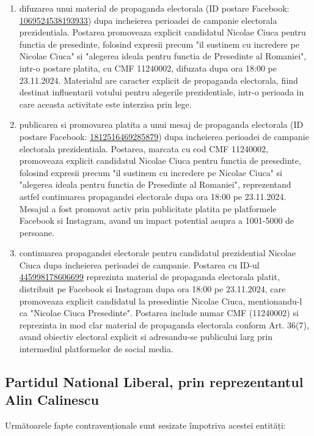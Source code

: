 \documentclass[a4paper,12pt]{article}
\begin{document}
\begin{enumerate}[leftmargin=*, label=\arabic*.)]
    \item difuzarea unui material de propaganda electorala (ID postare Facebook: \href{https://www.facebook.com/ads/library/?id=1069524538193933}{1069524538193933}) dupa incheierea perioadei de campanie electorala prezidentiala. Postarea promoveaza explicit candidatul Nicolae Ciuca pentru functia de presedinte, folosind expresii precum "il sustinem cu incredere pe Nicolae Ciuca" si "alegerea ideala pentru functia de Presedinte al Romaniei", intr-o postare platita, cu CMF 11240002, difuzata dupa ora 18:00 pe 23.11.2024. Materialul are caracter explicit de propaganda electorala, fiind destinat influentarii votului pentru alegerile prezidentiale, intr-o perioada in care aceasta activitate este interzisa prin lege.
    \item publicarea si promovarea platita a unui mesaj de propaganda electorala (ID postare Facebook: \href{https://www.facebook.com/ads/library/?id=1812516469285879}{1812516469285879}) dupa incheierea perioadei de campanie electorala prezidentiala. Postarea, marcata cu cod CMF 11240002, promoveaza explicit candidatul Nicolae Ciuca pentru functia de presedinte, folosind expresii precum "il sustinem cu incredere pe Nicolae Ciuca" si "alegerea ideala pentru functia de Presedinte al Romaniei", reprezentand astfel continuarea propagandei electorale dupa ora 18:00 pe 23.11.2024. Mesajul a fost promovat activ prin publicitate platita pe platformele Facebook si Instagram, avand un impact potential asupra a 1001-5000 de persoane.
    \item continuarea propagandei electorale pentru candidatul prezidential Nicolae Ciuca dupa incheierea perioadei de campanie. Postarea cu ID-ul \href{https://www.facebook.com/ads/library/?id=445998178606699}{445998178606699} reprezinta material de propaganda electorala platit, distribuit pe Facebook si Instagram dupa ora 18:00 pe 23.11.2024, care promoveaza explicit candidatul la presedintie Nicolae Ciuca, mentionandu-l ca "Nicolae Ciuca Presedinte". Postarea include numar CMF (11240002) si reprezinta in mod clar material de propaganda electorala conform Art. 36(7), avand obiectiv electoral explicit si adresandu-se publicului larg prin intermediul platformelor de social media.
\end{enumerate}

\vspace{0.5cm}

\subsection{Partidul National Liberal, prin reprezentantul Alin Calinescu}
Următoarele fapte contravenționale sunt sesizate împotriva acestei entități:
\end{document}
